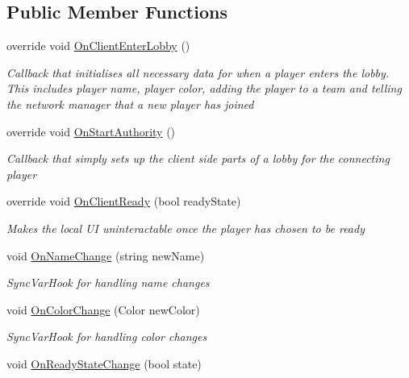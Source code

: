 \subsection*{Public Member Functions}
\begin{DoxyCompactItemize}
\item 
override void \hyperlink{class_d_l_network_lobby_player_a0037d8d1e0f67839133610663a1d206f}{On\+Client\+Enter\+Lobby} ()
\begin{DoxyCompactList}\small\item\em Callback that initialises all necessary data for when a player enters the lobby. This includes player name, player color, adding the player to a team and telling the network manager that a new player has joined \end{DoxyCompactList}\item 
override void \hyperlink{class_d_l_network_lobby_player_a1e0fa979ad95efaf24055632940fd2fb}{On\+Start\+Authority} ()
\begin{DoxyCompactList}\small\item\em Callback that simply sets up the client side parts of a lobby for the connecting player \end{DoxyCompactList}\item 
override void \hyperlink{class_d_l_network_lobby_player_a683da40a1af9342049f4221637e38356}{On\+Client\+Ready} (bool ready\+State)
\begin{DoxyCompactList}\small\item\em Makes the local UI uninteractable once the player has chosen to be ready \end{DoxyCompactList}\item 
void \hyperlink{class_d_l_network_lobby_player_af59e1193d1aea8384751952f693302c2}{On\+Name\+Change} (string new\+Name)
\begin{DoxyCompactList}\small\item\em Sync\+Var\+Hook for handling name changes \end{DoxyCompactList}\item 
void \hyperlink{class_d_l_network_lobby_player_a3af013212302d6d95a0defcc9e1e33a8}{On\+Color\+Change} (Color new\+Color)
\begin{DoxyCompactList}\small\item\em Sync\+Var\+Hook for handling color changes \end{DoxyCompactList}\item 
void \hyperlink{class_d_l_network_lobby_player_af960bcf62b831a8d546bc3623152f882}{On\+Ready\+State\+Change} (bool state)

\end{DoxyCompactItemize}
